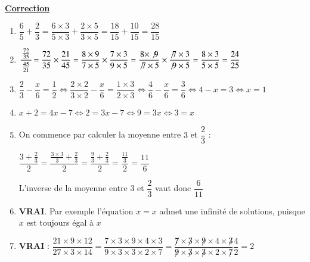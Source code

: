 \documentclass[oneside,12pt]{exam}          %
\begin{document}
\newpage
{}
\color{newblue}


\begin{center}
	\underline{\textbf{\large Correction}}
\end{center}

\begin{enumerate}[itemsep = 3mm]
	\item $\dfrac{6}{5} + \dfrac{2}{3} = \dfrac{6\times3}{5\times3} + \dfrac{2\times5}{3\times5} = \dfrac{18}{15} + \dfrac{10}{15} = \dfrac{28}{15}$
	
	\item $\cfrac{\,\frac{72}{35}\,}{\frac{45}{21}} = \dfrac{72}{35} \times \dfrac{21}{45}
	= \dfrac{8 \times 9}{7 \times 5} \times \dfrac{7 \times 3}{9 \times 5}
	= \dfrac{8 \times \not9}{\not7 \times 5} \times \dfrac{\not7 \times 3}{\not9 \times 5}
	= \dfrac{8 \times 3}{5 \times 5} = \dfrac{24}{25}$
	
	\item $\dfrac{2}{3}-\dfrac{x}{6} = \dfrac{1}{2} \Longleftrightarrow 
	\dfrac{2 \times 2}{3 \times 2}-\dfrac{x}{6} = \dfrac{1 \times 3}{2 \times 3} \Longleftrightarrow
	\dfrac{4}{6}-\dfrac{x}{6} = \dfrac{3}{6} \Longleftrightarrow 
	4 - x = 3 \Longleftrightarrow x = 1$
	
	\item $x + 2 = 4x - 7 \Longleftrightarrow 2 = 3x - 7 \Longleftrightarrow 9 = 3x \Longleftrightarrow 3 = x$
	
	\item On commence par calculer la moyenne entre $3$ et $\dfrac{2}{3}$ :
	
	$\dfrac{3+\frac{2}{3}}{2} = \dfrac{\frac{3 \times 3}{3} + \frac{2}{3}}{2} = \dfrac{\frac{9}{3} + \frac{2}{3}}{2} = \dfrac{\frac{11}{3}}{2} = \dfrac{11}{6}$
	
	L'inverse de la moyenne entre $3$ et $\dfrac{2}{3}$ vaut donc $\dfrac{6}{11}$
	
	\item \textbf{VRAI}. Par exemple l'équation $x=x$ admet une infinité de solutions, puisque $x$ est toujours égal à $x$
	\item \textbf{VRAI} : $\dfrac{21 \times 9 \times 12}{27 \times 3 \times 14} 
	= \dfrac{7 \times 3 \times 9 \times 4\times3}{9\times3 \times 3 \times 2\times7} 
	= \dfrac{\not7 \times \not3 \times \not9 \times 4 \times \not3}{\not9 \times \not3 \times \not3 \times 2 \times \not7}
	\dfrac{4}{2} = 2$
	

\end{enumerate}
\end{document}

